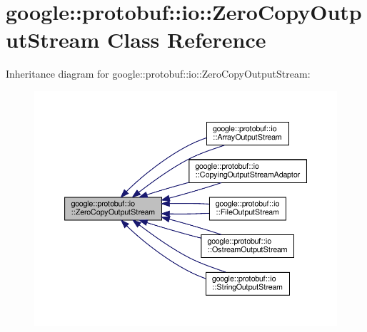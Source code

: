 \hypertarget{classgoogle_1_1protobuf_1_1io_1_1ZeroCopyOutputStream}{}\section{google\+:\+:protobuf\+:\+:io\+:\+:Zero\+Copy\+Output\+Stream Class Reference}
\label{classgoogle_1_1protobuf_1_1io_1_1ZeroCopyOutputStream}


Inheritance diagram for google\+:\+:protobuf\+:\+:io\+:\+:Zero\+Copy\+Output\+Stream\+:
\nopagebreak
\begin{figure}[H]
\begin{center}
\leavevmode
\includegraphics[width=350pt]{classgoogle_1_1protobuf_1_1io_1_1ZeroCopyOutputStream__inherit__graph}
\end{center}
\end{figure}
